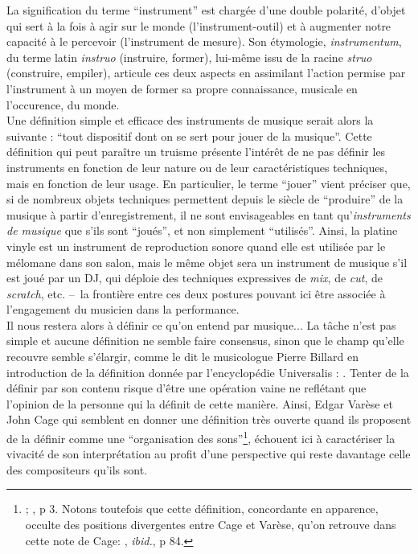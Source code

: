 \noindent La signification du terme ``instrument'' est chargée d'une double polarité, d'objet qui sert à la fois à agir sur le monde (l'instrument-outil) et à augmenter notre capacité à le percevoir (l'instrument de mesure). Son étymologie, \textit{instrumentum}, du terme latin \textit{instruo} (instruire, former), lui-même issu de la racine \textit{struo} (construire, empiler), articule ces deux aspects en assimilant l'action permise par l'instrument à un moyen de former sa propre connaissance, musicale en l'occurence, du monde.\\
\indent Une définition simple et efficace des instruments de musique serait alors la suivante : ``tout dispositif dont on se sert pour jouer de la musique''. Cette définition qui peut paraître un truisme présente l'intérêt de ne pas définir les instruments en fonction de leur nature ou de leur caractéristiques techniques, mais en fonction de leur usage. En particulier, le terme ``jouer'' vient préciser que, si de nombreux objets techniques permettent depuis le siècle de ``produire'' de la musique à partir d'enregistrement, il ne sont envisageables en tant qu'\textit{instruments de musique} que s'ils sont ``joués'', et non simplement ``utilisés''. Ainsi, la platine vinyle est un instrument de reproduction sonore quand elle est utilisée par le mélomane dans son salon, mais le même objet sera un instrument de musique s'il est joué par un \gls{DJ}, qui déploie des techniques expressives de \textit{mix}, de \textit{cut}, de \textit{scratch}, etc. --~la frontière entre ces deux postures pouvant ici être associée à l'engagement du musicien dans la performance.\\
\indent Il nous restera alors à définir ce qu'on entend par musique... La tâche n'est pas simple et aucune définition ne semble faire consensus, sinon que le champ qu'elle recouvre semble s'élargir, comme le dit le musicologue Pierre Billard en introduction de la définition donnée par l'encyclopédie Universalis : . Tenter de la définir par son contenu risque d'être une opération vaine ne reflétant que l'opinion de la personne qui la définit de cette manière. Ainsi, Edgar Varèse et John Cage qui semblent en donner une définition très ouverte quand ils proposent de la définir comme une ``organisation des sons''\footnote{ \cite{varese_liberation_1966};  \cite{cage_silence:_1961}, p 3. Notons toutefois que cette définition, concordante en apparence, occulte des positions divergentes entre Cage et Varèse, qu'on retrouve dans cette note de Cage: , \textit{ibid.}, p 84.}, échouent ici à caractériser la vivacité de son interprétation au profit d'une perspective qui reste davantage celle des compositeurs qu'ils sont.\\
